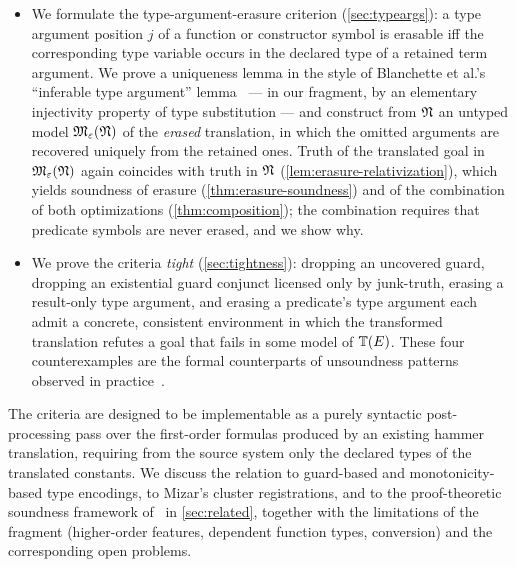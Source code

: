 \begin{itemize}
  and polarity-restricted cases, where only an implication holds, and prove a
  simultaneous-omission theorem justifying the fixpoint algorithm used in
  practice (\cref{prop:simultaneous}).
\item We formulate the type-argument-erasure criterion (\cref{sec:typeargs}):
  a type argument position $j$ of a function or constructor symbol is
  erasable iff the corresponding type variable occurs in the declared type of
  a retained term argument.  We prove a uniqueness lemma in the style of
  Blanchette et al.'s ``inferable type argument''
  lemma~\cite{BlanchetteBohmePopescuSmallbone2016} --- in our fragment, by an
  elementary injectivity property of type substitution --- and construct from
  $\mathfrak{N}$ an untyped model $\mathfrak{M}_{\varepsilon}(\mathfrak{N})$ of the \emph{erased} translation, in which
  the omitted arguments are recovered uniquely from the retained ones.  Truth
  of the translated goal in $\mathfrak{M}_{\varepsilon}(\mathfrak{N})$ again coincides with truth in $\mathfrak{N}$
  (\cref{lem:erasure-relativization}), which yields soundness of erasure
  (\cref{thm:erasure-soundness}) and of the combination of both optimizations
  (\cref{thm:composition}); the combination requires that predicate symbols
  are never erased, and we show why.
\item We prove the criteria \emph{tight} (\cref{sec:tightness}): dropping an
  uncovered guard, dropping an existential guard conjunct licensed only by
  junk-truth, erasing a result-only type argument, and erasing a predicate's
  type argument each admit a concrete, consistent environment in which the
  transformed translation refutes a goal that fails in some model of $\mathbb{T}(E)$.
  These four counterexamples are the formal counterparts of unsoundness
  patterns observed in practice~\cite{MengPaulson2008,
  BlanchetteBohmePopescuSmallbone2016,CzajkaKaliszyk2018}.
\end{itemize}

The criteria are designed to be implementable as a purely syntactic
post-processing pass over the first-order formulas produced by an existing
hammer translation, requiring from the source system only the declared types
of the translated constants.  We discuss the relation to guard-based and
monotonicity-based type encodings, to Mizar's cluster registrations, and to
the proof-theoretic soundness framework of~\cite{Czajka2018} in
\cref{sec:related}, together with the limitations of the fragment
(higher-order features, dependent function types, conversion) and the
corresponding open problems.
